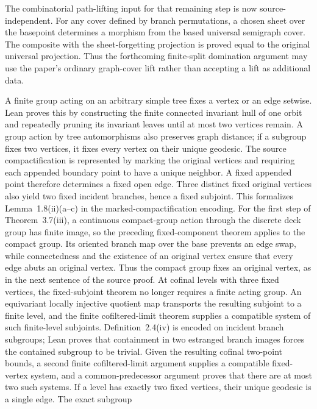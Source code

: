 \begin{definition}
  The combinatorial path-lifting input for that remaining step is now
  source-independent.  For any cover defined by branch permutations, a
  chosen sheet over the basepoint determines a morphism from the based
  universal semigraph cover.  The composite with the sheet-forgetting
  projection is proved equal to the original universal projection.  Thus the
  forthcoming finite-split domination argument may use the paper's ordinary
  graph-cover lift rather than accepting a lift as additional data.

  A finite group acting on an arbitrary simple tree fixes a vertex or an edge
  setwise.  Lean proves this by constructing the finite connected invariant
  hull of one orbit and repeatedly pruning its invariant leaves until at most
  two vertices remain.  A group action by tree automorphisms also preserves
  graph distance; if a subgroup fixes two vertices, it fixes every vertex on
  their unique geodesic.  The source compactification is represented by marking
  the original vertices and requiring each appended boundary point to have a
  unique neighbor.  A fixed appended point therefore determines a fixed open
  edge.  Three distinct fixed original vertices also yield two fixed incident
  branches, hence a fixed subjoint.  This formalizes Lemma~1.8(ii)(a--c) in the
  marked-compactification encoding.  For the first step of Theorem~3.7(iii),
  a continuous compact-group action through the discrete deck group has finite
  image, so the preceding fixed-component theorem applies to the compact
  group.  Its oriented branch map over the base prevents an edge swap, while
  connectedness and the existence of an original vertex ensure that every
  edge abuts an original vertex.  Thus the compact group fixes an original
  vertex, as in the next sentence of the source proof.  At cofinal levels with
  three fixed vertices, the fixed-subjoint theorem no longer requires a finite
  acting group.  An equivariant locally injective quotient map transports the
  resulting subjoint to a finite level, and the finite cofiltered-limit theorem
  supplies a compatible system of such finite-level subjoints.  Definition~2.4(iv)
  is encoded on incident branch subgroups; Lean proves that containment in two
  estranged branch images forces the contained subgroup to be trivial.  Given
  the resulting cofinal two-point bounds, a second finite cofiltered-limit
  argument supplies a compatible fixed-vertex system, and a common-predecessor
  argument proves that there are at most two such systems.  If a level has
  exactly two fixed vertices, their unique geodesic is a single edge.  The exact subgroup

\end{definition}
